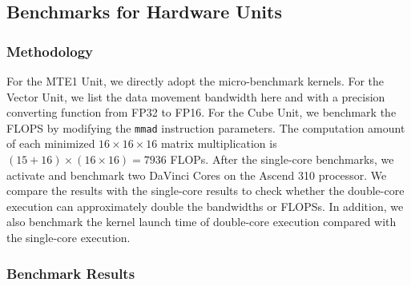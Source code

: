 \subsection{Benchmarks for Hardware Units \label{sec:cube_bench}}

\subsubsection{Methodology}

For the MTE1 Unit, we directly adopt the micro-benchmark kernels. For the Vector Unit, we list the data movement bandwidth here and with a precision converting function from FP32 to FP16. For the Cube Unit, we benchmark the FLOPS by modifying the \verb|mmad| instruction parameters. The computation amount of each minimized $16 \times 16 \times 16$ matrix multiplication is $(15 + 16) \times (16 \times 16) = 7936$ FLOPs. After the single-core benchmarks, we activate and benchmark two DaVinci Cores on the Ascend 310 processor. We compare the results with the single-core results to check whether the double-core execution can approximately double the bandwidths or FLOPSs. In addition, we also benchmark the kernel launch time of double-core execution compared with the single-core execution. 

\subsubsection{Benchmark Results} 

\begin{table}[tbp]
    \caption{Ascend 310 Cube Unit benchmark results}
    \label{tab:bench}
    \begin{center}
    \end{center}
    \end{table}


